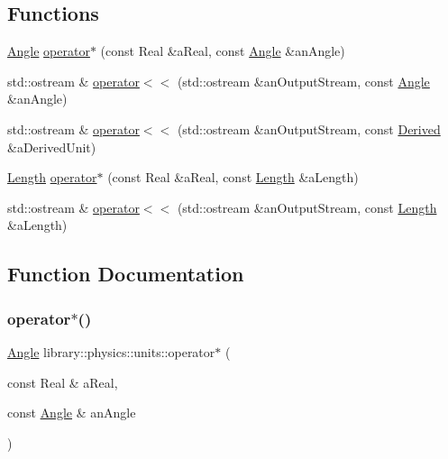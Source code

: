 \subsection*{Functions}
\begin{DoxyCompactItemize}
\item 
\hyperlink{classlibrary_1_1physics_1_1units_1_1_angle}{Angle} \hyperlink{namespacelibrary_1_1physics_1_1units_ac89514ddad142e1c8c6d67f0f7708b6b}{operator$\ast$} (const Real \&a\+Real, const \hyperlink{classlibrary_1_1physics_1_1units_1_1_angle}{Angle} \&an\+Angle)
\item 
std\+::ostream \& \hyperlink{namespacelibrary_1_1physics_1_1units_ae0f25add792e8ea9705789fb8587ec1b}{operator$<$$<$} (std\+::ostream \&an\+Output\+Stream, const \hyperlink{classlibrary_1_1physics_1_1units_1_1_angle}{Angle} \&an\+Angle)
\item 
std\+::ostream \& \hyperlink{namespacelibrary_1_1physics_1_1units_ae5fe5e8cca7d4b7bb172e0919e7173dc}{operator$<$$<$} (std\+::ostream \&an\+Output\+Stream, const \hyperlink{classlibrary_1_1physics_1_1units_1_1_derived}{Derived} \&a\+Derived\+Unit)
\item 
\hyperlink{classlibrary_1_1physics_1_1units_1_1_length}{Length} \hyperlink{namespacelibrary_1_1physics_1_1units_a00ff20791c9a7001f44dbb68a849b36d}{operator$\ast$} (const Real \&a\+Real, const \hyperlink{classlibrary_1_1physics_1_1units_1_1_length}{Length} \&a\+Length)
\item 
std\+::ostream \& \hyperlink{namespacelibrary_1_1physics_1_1units_a09416cc4b0022c4fbb1bd8c8306d5eab}{operator$<$$<$} (std\+::ostream \&an\+Output\+Stream, const \hyperlink{classlibrary_1_1physics_1_1units_1_1_length}{Length} \&a\+Length)
\end{DoxyCompactItemize}


\subsection{Function Documentation}
\mbox{\label{namespacelibrary_1_1physics_1_1units_ac89514ddad142e1c8c6d67f0f7708b6b}} 
\subsubsection{\texorpdfstring{operator$\ast$()}{operator*()}\hspace{0.1cm}{\footnotesize\ttfamily [1/2]}}
{\footnotesize\ttfamily \hyperlink{classlibrary_1_1physics_1_1units_1_1_angle}{Angle} library\+::physics\+::units\+::operator$\ast$ (\begin{DoxyParamCaption}\item[{const Real \&}]{a\+Real,  }\item[{const \hyperlink{classlibrary_1_1physics_1_1units_1_1_angle}{Angle} \&}]{an\+Angle }\end{DoxyParamCaption})}


